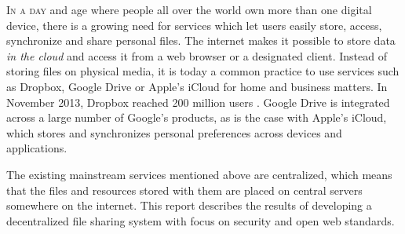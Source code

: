 \lettrine[lines=3]{I}{n a day} and age where people all over the world own more than one digital device, there is a growing need for services which let users easily store, access, synchronize and share personal files. The internet makes it possible to store data \emph{in the cloud} and access it from a web browser or a designated client. Instead of storing files on physical media, it is today a common practice to use services such as Dropbox, Google Drive or Apple's iCloud for home and business matters. In November 2013, Dropbox reached 200 million users \cite{Constine:2013:Online}. Google Drive is integrated across a large number of Google's products, as is the case with Apple's iCloud, which stores and synchronizes personal preferences across devices and applications.

The existing mainstream services mentioned above are centralized, which means that the files and resources stored with them are placed on central servers somewhere on the internet. This report describes the results of developing a decentralized file sharing system with focus on security and open web standards.






